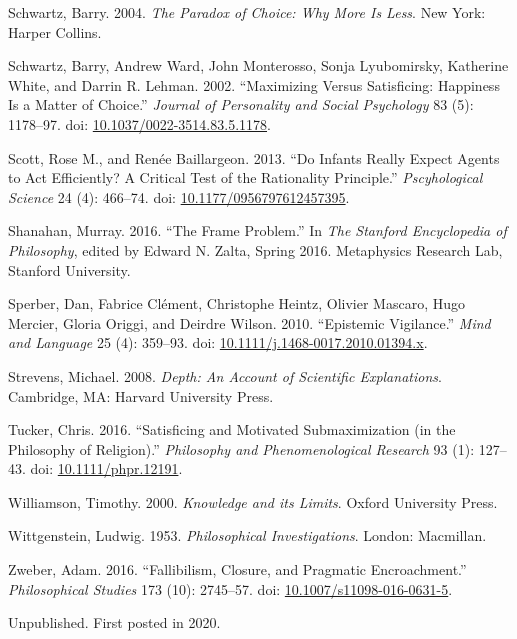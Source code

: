 \documentclass[
  10pt,
  letterpaper,
  DIV=11,
  numbers=noendperiod,
  twoside]{scrartcl}
\newlength{\cslhangindent}
\newenvironment{CSLReferences}[2] %
 {\begin{list}{}{%
  \setlength{\itemindent}{0pt}
  \setlength{\leftmargin}{0pt}
  \setlength{\parsep}{0pt}
  \ifodd #1
   \setlength{\leftmargin}{\cslhangindent}
   \setlength{\itemindent}{-1\cslhangindent}
  \fi
  \setlength{\itemsep}{#2\baselineskip}}}
 {\end{list}}
\begin{document}
\begin{CSLReferences}{1}{0}
Schwartz, Barry. 2004. \emph{The Paradox of Choice: Why More Is Less}.
New York: Harper Collins.

Schwartz, Barry, Andrew Ward, John Monterosso, Sonja Lyubomirsky,
Katherine White, and Darrin R. Lehman. 2002. {``Maximizing Versus
Satisficing: Happiness Is a Matter of Choice.''} \emph{Journal of
Personality and Social Psychology} 83 (5): 1178--97. doi:
\href{https://doi.org/10.1037/0022-3514.83.5.1178}{10.1037/0022-3514.83.5.1178}.

Scott, Rose M., and Renée Baillargeon. 2013. {``Do Infants Really Expect
Agents to Act Efficiently? A Critical Test of the Rationality
Principle.''} \emph{Pscyhological Science} 24 (4): 466--74. doi:
\href{https://doi.org/10.1177/0956797612457395}{10.1177/0956797612457395}.

Shanahan, Murray. 2016. {``The Frame Problem.''} In \emph{The Stanford
Encyclopedia of Philosophy}, edited by Edward N. Zalta, Spring 2016.
Metaphysics Research Lab, Stanford University.

Sperber, Dan, Fabrice Clément, Christophe Heintz, Olivier Mascaro, Hugo
Mercier, Gloria Origgi, and Deirdre Wilson. 2010. {``Epistemic
Vigilance.''} \emph{Mind and Language} 25 (4): 359--93. doi:
\href{https://doi.org/10.1111/j.1468-0017.2010.01394.x}{10.1111/j.1468-0017.2010.01394.x}.

Strevens, Michael. 2008. \emph{Depth: An Account of Scientific
Explanations}. Cambridge, MA: Harvard University Press.

Tucker, Chris. 2016. {``Satisficing and Motivated Submaximization (in
the Philosophy of Religion).''} \emph{Philosophy and Phenomenological
Research} 93 (1): 127--43. doi:
\href{https://doi.org/10.1111/phpr.12191}{10.1111/phpr.12191}.

Williamson, Timothy. 2000. \emph{{Knowledge and its Limits}}. Oxford
University Press.

Wittgenstein, Ludwig. 1953. \emph{Philosophical Investigations}. London:
Macmillan.

Zweber, Adam. 2016. {``Fallibilism, Closure, and Pragmatic
Encroachment.''} \emph{Philosophical Studies} 173 (10): 2745--57. doi:
\href{https://doi.org/10.1007/s11098-016-0631-5}{10.1007/s11098-016-0631-5}.

\end{CSLReferences}



\noindent Unpublished. First posted in 2020.
\end{document}
